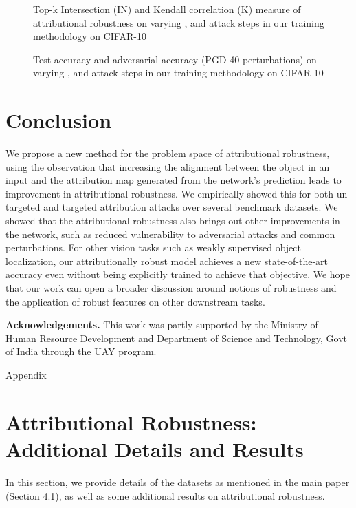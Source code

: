 \documentclass[runningheads]{llncs}
\newcommand{\appendixhead}{\begin{center}
  {\huge Appendix \small }  
\end{center}}\makeatother
\begin{document}
\begin{figure}[t]
\centering
{}
\caption{\footnotesize{Top-k Intersection (IN) and Kendall correlation (K) measure of attributional robustness on varying ,  and attack steps in our training methodology on CIFAR-10}}
\label{fig:eval_plot}
\end{figure}

\begin{figure}[t]
\centering
{}
\caption{\footnotesize{Test accuracy and adversarial accuracy (PGD-40 perturbations) on varying ,  and attack steps in our training methodology on CIFAR-10}}
\label{fig:acc_plot}
\end{figure}


\section{Conclusion}
We propose a new method for the problem space of attributional robustness, using the observation that increasing the alignment between the object in an input and the attribution map generated from the network's prediction leads to improvement in attributional robustness. We empirically showed this for both un-targeted and targeted attribution attacks over several benchmark datasets. We showed that the attributional robustness also brings out other improvements in the network, such as reduced vulnerability to adversarial attacks and common perturbations. For other vision tasks such as weakly supervised object localization, our attributionally robust model achieves a new state-of-the-art accuracy even without being explicitly trained to achieve that objective. We hope that our work can open a broader discussion around notions of robustness and the application of robust features on other downstream tasks.

\noindent\textbf{Acknowledgements.} This work was partly supported by the Ministry of Human Resource Development and Department of Science and Technology, Govt of India through the UAY program.

\clearpage




\newpage
\appendixhead

\appendix

\section{Attributional Robustness: Additional Details and Results}
\label{sec_art_additional_results}
In this section, we provide details of the datasets as mentioned in the main paper (Section 4.1), as well as some additional results on attributional robustness.
\end{document}
